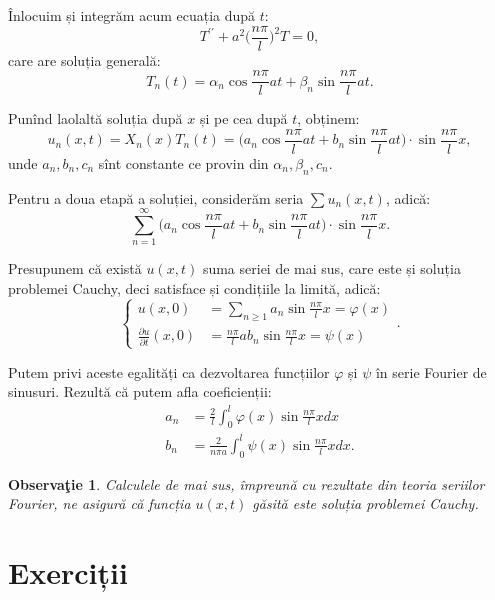 \documentclass[11pt,a4paper]{article}
\theoremstyle{dotless}
\theoremstyle{dotlessdr}
\newtheorem{remark}{Observa\c{t}ie}[section]
\begin{document}
Înlocuim și integrăm acum ecuația după $ t $:
\[
  T^{\prime\prime} + a^2\Big( \frac{n\pi}{l} \Big)^2 T = 0,
\]
care are soluția generală:
\[
  T_n(t) = \alpha_n \cos \frac{n\pi}{l} at + \beta_n\sin \frac{n\pi}{l} at.
\]

Punînd laolaltă soluția după $ x $ și pe cea după $ t $, obținem:
\begin{equation} \label{eq:coarda-particulara}
  u_n(x, t) = X_n(x) T_n(t) = \Big( a_n \cos \frac{n\pi}{l} at + %
  b_n \sin \frac{n\pi}{l} at \Big) \cdot \sin \frac{n\pi}{l} x,
\end{equation}
unde $ a_n, b_n, c_n $ sînt constante ce provin din $ \alpha_n, \beta_n, c_n $.

Pentru a doua etapă a soluției, considerăm seria $ \sum u_n(x, t) $, adică:
\[
  \sum_{n = 1}^\infty \Big(a_n\cos\frac{n\pi}{l} at + %
  b_n \sin \frac{n\pi}{l} at\Big) \cdot \sin \frac{n \pi}{l} x.
\]

Presupunem că există $ u(x, t) $ suma seriei de mai sus, care este și soluția
problemei Cauchy, deci satisface și condițiile la limită, adică:
\[
  \begin{cases}
    u(x, 0) &= \sum_{n\geq 1} a_n \sin \frac{n\pi}{l} x = \varphi(x) \\
    \frac{\partial u}{\partial t}(x, 0) &= \frac{n\pi}{l}ab_n\sin\frac{n\pi}{l}x = \psi(x)
  \end{cases}.
\]

Putem privi aceste egalități ca dezvoltarea funcțiilor $ \varphi $ și $ \psi $ în serie
Fourier de sinusuri. Rezultă că putem afla coeficienții:
\begin{eqnarray} \label{eq:fourier}
  a_n &= \frac{2}{l} \int_0^l \varphi(x) \sin \frac{n\pi}{l} xdx \\
  b_n &= \frac{2}{n\pi a} \int_0^l \psi(x) \sin \frac{n \pi}{l} xdx.
\end{eqnarray}

\begin{remark}\label{rk:coarda-finita-fourier}
  Calculele de mai sus, împreună cu rezultate din teoria seriilor Fourier, ne asigură
  că funcția $ u(x, t) $ găsită este soluția problemei Cauchy.
\end{remark}


\section{Exerciții}
\end{document}

